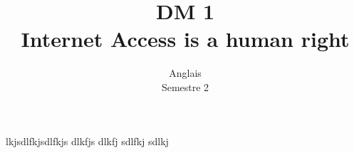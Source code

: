 \documentclass{article}
\title{DM 1\\ Internet Access is a human right}
\date{Anglais\\ Semestre 2}
\begin{document}
	\maketitle
		lkjsdlfkjsdlfkjs dlkfjs dlkfj sdlfkj sdlkj
\end{document}
